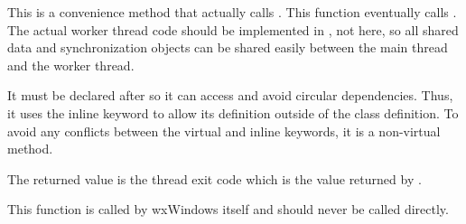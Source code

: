 
This is a convenience method that actually calls
.  This function
eventually calls .
The actual worker thread code should be implemented in
, not here, so all
shared data and synchronization objects can be shared easily between the
main thread and the worker thread.

It must be declared after  so it
can access  and avoid
circular dependencies.  Thus, it uses the inline keyword to allow its
definition outside of the class definition.  To avoid any conflicts
between the virtual and inline keywords, it is a non-virtual method.

The returned value is the thread exit code which is the value returned by
.

This function is called by wxWindows itself and should never be called
directly.
